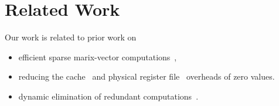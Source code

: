 \section{Related Work}
\label{sec:related}

Our work is related to prior work on 

\begin{itemize}
\item efficient sparse marix-vector computations~\cite{Eisenstat82, IntelSparseMatrix, Carter99, Srinidhi12, Fowers13, Seshadri15}, 

\item reducing the cache~\cite{Villa00, Zhang00, Dusser09, Islam09} and physical register file~\cite{Jourdan98, Balakrishnan03} overheads of zero values.  

\item dynamic elimination of redundant computations~\cite{Connors00, Collins01, Butts02, Sassone04}.

\end{itemize}